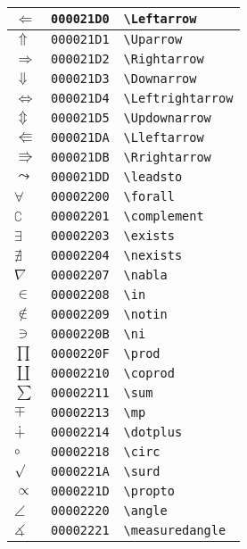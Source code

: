 \begin{longtable}{|l|l|l|}
\hline
$\Leftarrow$ & \texttt{000021D0} & \verb|\Leftarrow| \\
\hline
$\Uparrow$ & \texttt{000021D1} & \verb|\Uparrow| \\
\hline
$\Rightarrow$ & \texttt{000021D2} & \verb|\Rightarrow| \\
\hline
$\Downarrow$ & \texttt{000021D3} & \verb|\Downarrow| \\
\hline
$\Leftrightarrow$ & \texttt{000021D4} & \verb|\Leftrightarrow| \\
\hline
$\Updownarrow$ & \texttt{000021D5} & \verb|\Updownarrow| \\
\hline
$\Lleftarrow$ & \texttt{000021DA} & \verb|\Lleftarrow| \\
\hline
$\Rrightarrow$ & \texttt{000021DB} & \verb|\Rrightarrow| \\
\hline
$\leadsto$ & \texttt{000021DD} & \verb|\leadsto| \\
\hline
$\forall$ & \texttt{00002200} & \verb|\forall| \\
\hline
$\complement$ & \texttt{00002201} & \verb|\complement| \\
\hline
$\exists$ & \texttt{00002203} & \verb|\exists| \\
\hline
$\nexists$ & \texttt{00002204} & \verb|\nexists| \\
\hline
$\nabla$ & \texttt{00002207} & \verb|\nabla| \\
\hline
$\in$ & \texttt{00002208} & \verb|\in| \\
\hline
$\notin$ & \texttt{00002209} & \verb|\notin| \\
\hline
$\ni$ & \texttt{0000220B} & \verb|\ni| \\
\hline
$\prod$ & \texttt{0000220F} & \verb|\prod| \\
\hline
$\coprod$ & \texttt{00002210} & \verb|\coprod| \\
\hline
$\sum$ & \texttt{00002211} & \verb|\sum| \\
\hline
$\mp$ & \texttt{00002213} & \verb|\mp| \\
\hline
$\dotplus$ & \texttt{00002214} & \verb|\dotplus| \\
\hline
$\circ$ & \texttt{00002218} & \verb|\circ| \\
\hline
$\surd$ & \texttt{0000221A} & \verb|\surd| \\
\hline
$\propto$ & \texttt{0000221D} & \verb|\propto| \\
\hline
$\angle$ & \texttt{00002220} & \verb|\angle| \\
\hline
$\measuredangle$ & \texttt{00002221} & \verb|\measuredangle| \\

\end{longtable}
